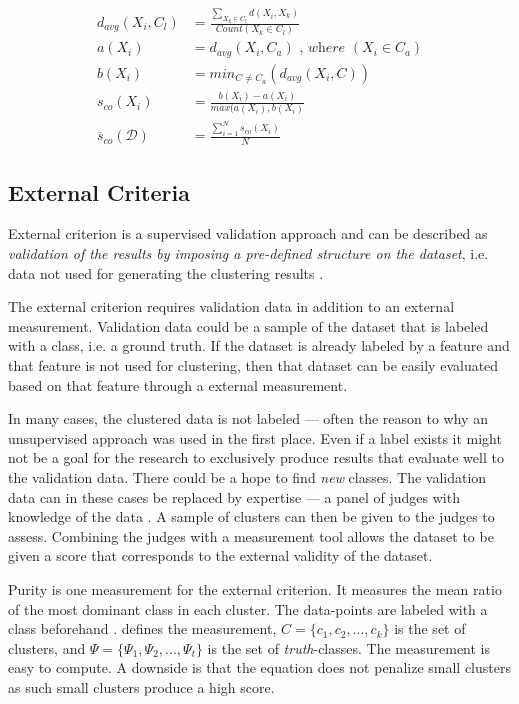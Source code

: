 \documentclass[../report.tex]{subfiles}
\begin{document}
\begin{align}
  d_{avg}(X_i,C_l) &= \frac{\sum_{X_k \in C_l}d(X_i,X_k)}{Count(X_k \in C_l)} \\
  a(X_i) &= d_{avg}(X_i,C_a) \textit{ , where } (X_i \in C_a) \\
  b(X_i) &= min_{C \neq C_a}(d_{avg}(X_i,C)) \\
 \label{eq:sil}
  s_{co}(X_i) &= \frac{b(X_i) - a(X_i)}{max(a(X_i), b(X_i)} \\
\label{eq:avg_s}
  \overline{s}_{co}(\mathcal{D}) &= \frac{\sum^{N}_{i=1} s_{co}(X_i)}{N}
\end{align}


\subsection{External Criteria}
External criterion is a supervised validation approach and can be described as \textit{validation of the results by imposing a pre-defined structure on the dataset}, i.e. data not used for generating the clustering results \cite{Halkidi2002}.

The external criterion requires validation data in addition to an external measurement. Validation data could be a sample of the dataset that is labeled with a class, i.e. a ground truth. If the dataset is already labeled by a feature and that feature is not used for clustering, then that dataset can be easily evaluated based on that feature through a external measurement.

In many cases, the clustered data is not labeled --- often the reason to why an unsupervised approach was used in the first place. Even if a label exists it might not be a goal for the research to exclusively produce results that evaluate well to the validation data. There could be a hope to find \textit{new} classes. The validation data can in these cases be replaced by expertise --- a panel of judges with knowledge of the data \cite{manning2010introduction}. A sample of clusters can then be given to the judges to assess. Combining the judges with a measurement tool allows the dataset to be given a score that corresponds to the external validity of the dataset.

Purity is one measurement for the external criterion. It measures the mean ratio of the most dominant class in each cluster. The data-points are labeled with a class beforehand \cite{manning2010introduction}.  defines the measurement, $C = \{c_1,c_2,...,c_k\}$ is the set of clusters, and $\Psi = \{\Psi_1,\Psi_2,...,\Psi_t \}$ is the set of \textit{truth}-classes. The measurement is easy to compute. A downside is that the equation does not penalize small clusters as such small clusters produce a high score.
\end{document}
